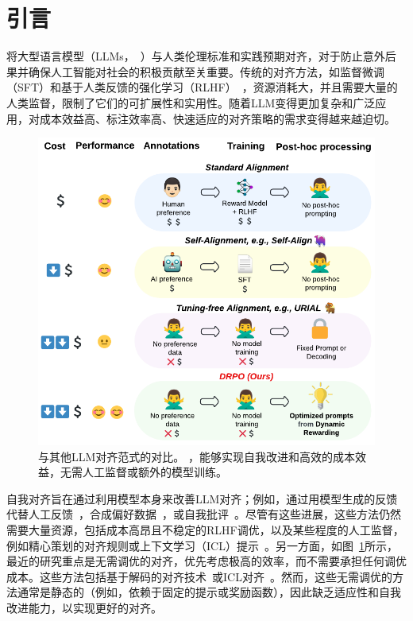 \section{引言}

将大型语言模型（LLMs，~\citealt{brown2020language,chowdhery2023palm, touvron2023llama,achiam2023gpt}）与人类伦理标准和实践预期对齐，对于防止意外后果并确保人工智能对社会的积极贡献至关重要。传统的对齐方法，如监督微调（SFT）和基于人类反馈的强化学习（RLHF）~\cite{bai2022constitutional, ouyang2022training}，资源消耗大，并且需要大量的人类监督，限制了它们的可扩展性和实用性。随着LLM变得更加复杂和广泛应用，对成本效益高、标注效率高、快速适应的对齐策略的需求变得越来越迫切。

\begin{figure}
    \centering
    \includegraphics[width=1\linewidth]{images/DRPO_comparison.pdf}
    \vspace{-18pt}
    \caption{与其他LLM对齐范式的对比。 ，能够实现自我改进和高效的成本效益，无需人工监督或额外的模型训练。}
    \vspace{-22pt}
    \label{fig:paradigm_comparison}
\end{figure}

自我对齐旨在通过利用模型本身来改善LLM对齐；例如，通过用模型生成的反馈代替人工反馈~\cite{lee2023rlaif}，合成偏好数据~\cite{kim2023aligning, sun2024principle}，或自我批评~\cite{bai2022constitutional}。尽管有这些进展，这些方法仍然需要大量资源，包括成本高昂且不稳定的RLHF调优，以及某些程度的人工监督，例如精心策划的对齐规则或上下文学习（ICL）提示~\cite{sun2024principle}。另一方面，如图~\ref{fig:paradigm_comparison}所示，最近的研究重点是无需调优的对齐，优先考虑极高的效率，而不需要承担任何调优成本。这些方法包括基于解码的对齐技术~\cite{li2023rain, wang2024inferaligner}或ICL对齐~\cite{han2023context, Lin2024ReAlign, zhao2024context}。然而，这些无需调优的方法通常是静态的（例如，依赖于固定的提示或奖励函数），因此缺乏适应性和自我改进能力，以实现更好的对齐。

